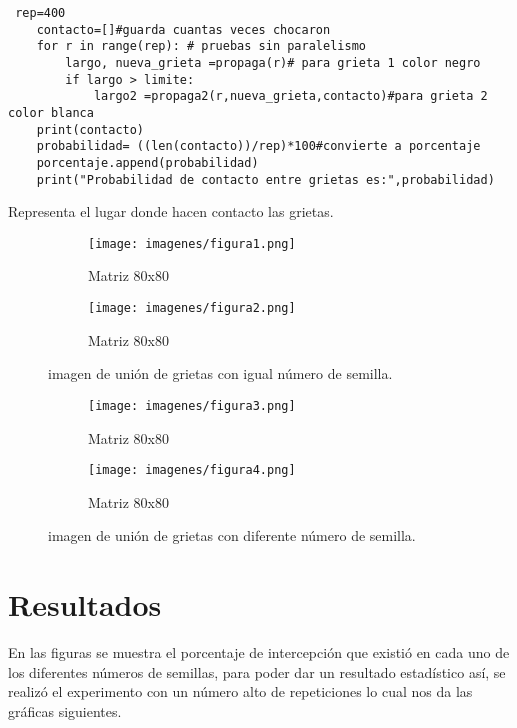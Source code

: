 \documentclass{article}
\begin{document}
\renewcommand{\listingscaption}{Código}
\begin{listing}[H]
  \begin{verbatim}
 rep=400
    contacto=[]#guarda cuantas veces chocaron
    for r in range(rep): # pruebas sin paralelismo
        largo, nueva_grieta =propaga(r)# para grieta 1 color negro
        if largo > limite:
            largo2 =propaga2(r,nueva_grieta,contacto)#para grieta 2 color blanca
    print(contacto)
    probabilidad= ((len(contacto))/rep)*100#convierte a porcentaje
    porcentaje.append(probabilidad)
    print("Probabilidad de contacto entre grietas es:",probabilidad)  
  \end{verbatim}
  \label{lst:fibo}
  \caption{Representa el lugar donde hacen contacto las grietas.}
\end{listing}

 \begin{figure}[H]
\centering
\begin{subfigure}[b]{0.35\linewidth}
\texttt{[image: imagenes/figura1.png]}
\caption{Matriz 80x80}
\end{subfigure}
\begin{subfigure}[b]{0.35\linewidth}
\texttt{[image: imagenes/figura2.png]}
\caption{Matriz 80x80}
\end{subfigure}
\caption{imagen de unión de grietas con igual número de semilla.}
\label{fig:westminster}
\end{figure}

\begin{figure}[H]
\centering
\begin{subfigure}[b]{0.35\linewidth}
\texttt{[image: imagenes/figura3.png]}
\caption{Matriz 80x80}
\end{subfigure}
\begin{subfigure}[b]{0.35\linewidth}
\texttt{[image: imagenes/figura4.png]}
\caption{Matriz 80x80}
\end{subfigure}
\caption{imagen de unión de grietas con diferente número de semilla.}
\label{fig:westminster}
\end{figure}


 \newpage
\section{Resultados}
En las figuras se muestra el porcentaje de intercepción que existió en cada uno de los diferentes números de semillas, para poder dar un resultado estadístico así, se realizó el experimento con un número alto de repeticiones lo cual nos da las gráficas siguientes.
\end{document}
